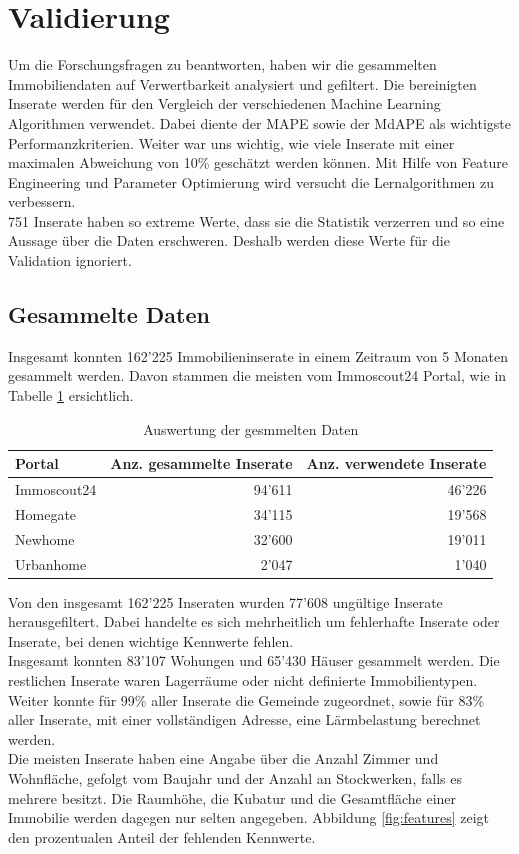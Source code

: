 \section{Validierung}
Um die Forschungsfragen zu beantworten, haben wir die gesammelten Immobiliendaten auf Verwertbarkeit analysiert und gefiltert. Die bereinigten Inserate werden für den Vergleich der verschiedenen Machine Learning Algorithmen verwendet. Dabei diente der MAPE sowie der MdAPE als wichtigste Performanzkriterien. Weiter war uns wichtig, wie viele Inserate mit einer maximalen Abweichung von 10\% geschätzt werden können. Mit Hilfe von Feature Engineering und Parameter Optimierung wird versucht die Lernalgorithmen zu verbessern.\\
751 Inserate haben so extreme Werte, dass sie die Statistik verzerren und so eine Aussage über die Daten erschweren. Deshalb werden diese Werte für die Validation ignoriert.

\subsection{Gesammelte Daten}
Insgesamt konnten 162’225 Immobilieninserate in einem Zeitraum von 5 Monaten gesammelt werden. Davon stammen die meisten vom Immoscout24 Portal, wie in Tabelle \ref{tab:crawled_data} ersichtlich.

\begin{table}[ht]
\centering
{}
\begin{tabular}{@{}lrr@{}}
\toprule
Portal &  Anz. gesammelte Inserate & Anz. verwendete Inserate \\
\midrule
Immoscout24 & 94'611 & 46'226\\
Homegate & 34'115 & 19'568\\
Newhome & 32'600 & 19'011\\
Urbanhome & 2'047 & 1'040\\
\bottomrule
\end{tabular}
\caption{Auswertung der gesmmelten Daten}
\label{tab:crawled_data}
\end{table}

Von den insgesamt 162’225 Inseraten wurden 77’608 ungültige Inserate herausgefiltert.
Dabei handelte es sich mehrheitlich um fehlerhafte Inserate oder Inserate, bei denen wichtige Kennwerte fehlen.\\
Insgesamt konnten 83’107 Wohungen und 65’430 Häuser gesammelt werden. Die restlichen Inserate waren Lagerräume oder nicht definierte Immobilien\-typen.\\
Weiter konnte für 99\% aller Inserate die Gemeinde zugeordnet, sowie für 83\% aller Inserate, mit einer vollständigen Adresse, eine Lärmbelastung berechnet werden.\\
Die meisten Inserate haben eine Angabe über die Anzahl Zimmer und Wohnfläche, gefolgt vom Baujahr und der Anzahl an Stockwerken, falls es mehrere besitzt. Die Raumhöhe, die Kubatur und die Gesamtfläche einer Immobilie werden dagegen nur selten angegeben. Abbildung \ref{fig:features} zeigt den prozentualen Anteil der fehlenden Kennwerte.

